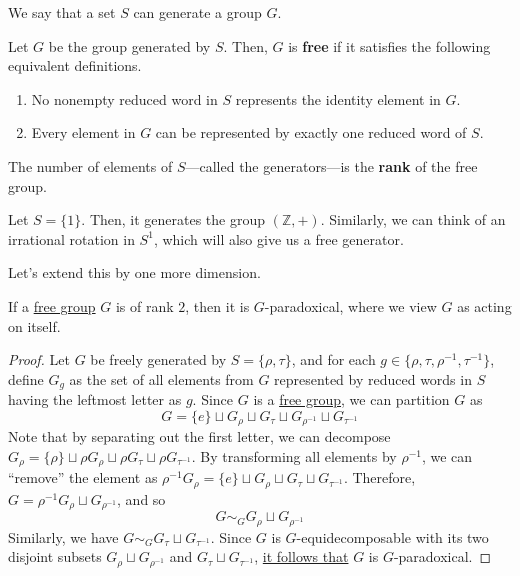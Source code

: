   We say that a set $S$ can generate a group $G$. 

  \begin{definition}
    \label{def:free-group}
    Let $G$ be the group generated by $S$. Then, $G$ is \textbf{free} if it satisfies the following equivalent definitions. 
    \begin{enumerate}
      \item No nonempty reduced word in $S$ represents the identity element in $G$. 
      \item Every element in $G$ can be represented by exactly one reduced word of $S$. 
    \end{enumerate}
    The number of elements of $S$---called the generators---is the \textbf{rank} of the free group. 
  \end{definition}

  \begin{example}
    \label{ex:free-group-of-rank-1}
    Let $S = \{1\}$. Then, it generates the group $(\mathbb{Z}, +)$. Similarly, we can think of an irrational rotation in $S^1$, which will also give us a free generator. 
  \end{example}

  Let's extend this by one more dimension. 

  \begin{lemma}
    \label{thm:rank2-paradox}
    If a \hyperref[def:free-group]{free group} $G$ is of rank $2$, then it is $G$-paradoxical, where we view $G$ as acting on itself. 
  \end{lemma}
  \begin{proof}
    Let $G$ be freely generated by $S = \{\rho, \tau\}$, and for each $g \in \{\rho, \tau, \rho^{-1}, \tau^{-1}\}$, define $G_g$ as the set of all elements from $G$ represented by reduced words in $S$ having the leftmost letter as $g$. Since $G$ is a \hyperref[def:free-group]{free group}, we can partition $G$ as 
    \begin{equation}
      G = \{e\} \sqcup G_\rho \sqcup G_\tau \sqcup G_{\rho^{-1}} \sqcup G_{\tau^{-1}}
    \end{equation}
    Note that by separating out the first letter, we can decompose $G_\rho = \{\rho\} \sqcup \rho G_{\rho} \sqcup \rho G_\tau \sqcup \rho G_{\tau^{-1}}$. By transforming all elements by $\rho^{-1}$, we can ``remove'' the element as $\rho^{-1} G_{\rho} = \{e\} \sqcup G_\rho \sqcup G_\tau \sqcup G_{\tau^{-1}}$. Therefore, $G = \rho^{-1} G_\rho \sqcup G_{\rho^{-1}}$, and so 
    \begin{equation}
      G \sim_G G_\rho \sqcup G_{\rho^{-1}} 
    \end{equation}
    Similarly, we have $G \sim_G G_\tau \sqcup G_{\tau^{-1}}$. Since $G$ is $G$-equidecomposable with its two disjoint subsets $G_{\rho} \sqcup G_{\rho^{-1}}$ and $G_{\tau} \sqcup G_{\tau^{-1}}$, \hyperref[thm:disjoint-subset-paradoxical]{it follows that} $G$ is $G$-paradoxical. 
  \end{proof}

